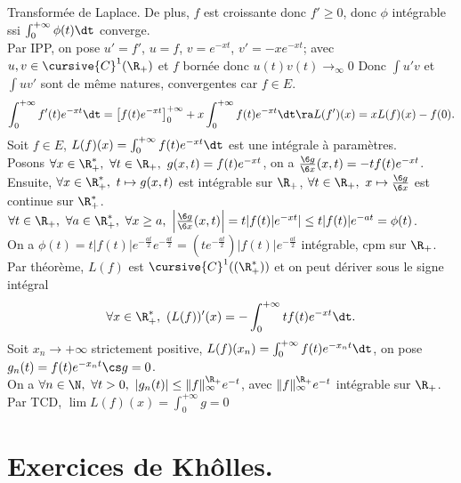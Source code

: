 \documentclass[11pt]{article}
\begin{document}
\begin{ex}{Transformée de Laplace.}{}
    De plus, $f$ est croissante donc $f'\geq0$, donc $\phi$ intégrable ssi $\int_0^{+\infty}\phi(t)\dt$ converge.\\
    Par IPP, on pose $u'=f'$, $u=f$, $v=e^{-xt}$, $v'=-xe^{-xt}$; avec $u,v\in\cursive{C}^1(\R_+)$ et $f$ bornée donc $u(t)v(t)\to_{\infty}0$
    Donc $\int u'v$ et $\int uv'$ sont de même natures, convergentes car $f\in E$. 
    \begin{equation*}
        \int_0^{+\infty}f'(t)e^{-xt}\dt = \left[ f(t)e^{-xt} \right]_0^{+\infty} + x\int_0^{+\infty}f(t)e^{-xt}\dt \ra L(f')(x) = xL(f)(x)-f(0).
    \end{equation*}
     Soit $f\in E$, $L(f)(x)=\int_0^{+\infty}f(t)e^{-xt}\dt$ est une intégrale à paramètres.\\
    Posons $\forall x \in \R_+^*, ~ \forall t \in \R_+, ~ g(x,t)=f(t)e^{-xt}$, on a $\frac{\6 g}{\6 x}(x,t) = -tf(t)e^{-xt}$.\\
    Ensuite, $\forall x \in \R_+^*, ~ t\mapsto g(x,t)$ est intégrable sur $\R_+$, $\forall t \in \R_+, ~ x\mapsto\frac{\6 g}{\6 x}$ est continue sur $\R_+^*$. \\
    $\forall t \in \R_+, ~ \forall a \in \R_+^*, ~ \forall x \geq a, ~ \left|\frac{\6 g}{\6 x}(x,t)\right| = t|f(t)|e^{-xt}|\leq t|f(t)|e^{-at}=\phi(t)$.\\
    On a $\phi(t)=t|f(t)|e^{-\frac{at}{2}}e^{-\frac{at}{2}}=(te^{-\frac{at}{2}})|f(t)|e^{-\frac{at}{2}}$ intégrable, cpm sur $\R_+$.\\
    Par théorème, $L(f)$ est $\cursive{C}^1((\R_+^*))$ et on peut dériver sous le signe intégral
    \begin{equation*}
        \forall x \in \R_+^*, ~ (L(f))'(x) = -\int_0^{+\infty}tf(t)e^{-xt}\dt.
    \end{equation*}
     Soit $x_n\to+\infty$ strictement positive, $L(f)(x_n)=\int_0^{+\infty}f(t)e^{-x_n t}\dt$, on pose $g_n(t)=f(t)e^{-x_n t}\cs g=0$.\\
    On a $\forall n \in \N, ~ \forall t > 0, ~ |g_n(t)|\leq\|f\|_\infty^{\R_+}e^{-t}$, avec $\|f\|_\infty^{\R_+}e^{-t}$ intégrable sur $\R_+$.\\
    Par TCD, $\lim L(f)(x)=\int_0^{+\infty} g=0$
\end{ex}

\pagebreak

\section{Exercices de Khôlles.}
\end{document}
